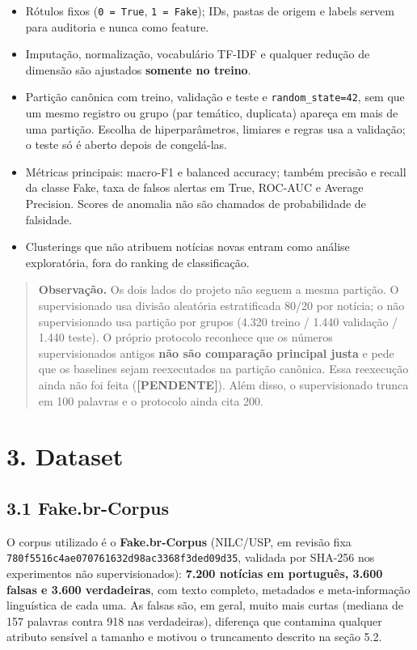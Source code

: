 \documentclass[
  brazilian,
  11pt,
]{article}
\providecommand{\tightlist}{%
  \setlength{\itemsep}{0pt}\setlength{\parskip}{0pt}}
\begin{document}
\begin{itemize}
\tightlist
\item
  Rótulos fixos (\texttt{0\ =\ True}, \texttt{1\ =\ Fake}); IDs, pastas de origem e labels servem para auditoria e nunca como feature.
\item
  Imputação, normalização, vocabulário TF-IDF e qualquer redução de dimensão são ajustados \textbf{somente no treino}.
\item
  Partição canônica com treino, validação e teste e \texttt{random\_state=42}, sem que um mesmo registro ou grupo (par temático, duplicata) apareça em mais de uma partição. Escolha de hiperparâmetros, limiares e regras usa a validação; o teste só é aberto depois de congelá-las.
\item
  Métricas principais: macro-F1 e balanced accuracy; também precisão e recall da classe Fake, taxa de falsos alertas em True, ROC-AUC e Average Precision. Scores de anomalia não são chamados de probabilidade de falsidade.
\item
  Clusterings que não atribuem notícias novas entram como análise exploratória, fora do ranking de classificação.
\end{itemize}

\begin{quote}
\textbf{Observação.} Os dois lados do projeto não seguem a mesma partição. O supervisionado usa divisão aleatória estratificada 80/20 por notícia; o não supervisionado usa partição por grupos (4.320 treino / 1.440 validação / 1.440 teste). O próprio protocolo reconhece que os números supervisionados antigos \textbf{não são comparação principal justa} e pede que os baselines sejam reexecutados na partição canônica. Essa reexecução ainda não foi feita (\textbf{{[}PENDENTE{]}}). Além disso, o supervisionado trunca em 100 palavras e o protocolo ainda cita 200.
\end{quote}

\section{3. Dataset}\label{dataset}

\subsection{3.1 Fake.br-Corpus}\label{fake.br-corpus}

O corpus utilizado é o \textbf{Fake.br-Corpus} (NILC/USP, em revisão fixa \texttt{780f5516c4ae070761632d98ac3368f3ded09d35}, validada por SHA-256 nos experimentos não supervisionados): \textbf{7.200 notícias em português, 3.600 falsas e 3.600 verdadeiras}, com texto completo, metadados e meta-informação linguística de cada uma. As falsas são, em geral, muito mais curtas (mediana de 157 palavras contra 918 nas verdadeiras), diferença que contamina qualquer atributo sensível a tamanho e motivou o truncamento descrito na seção 5.2.
\end{document}
